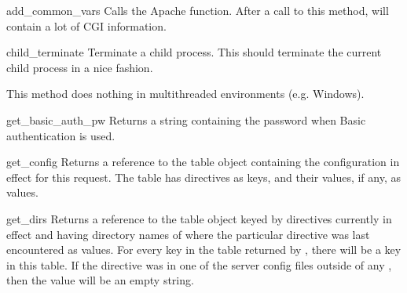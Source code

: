 \begin{methoddesc}[Request]{add_common_vars}{}
Calls the Apache  function. After a
call to this method,  will contain a
lot of CGI information.
\end{methoddesc}

\begin{methoddesc}[Request]{child_terminate}{}
Terminate a child process. This should terminate the current child
process in a nice fashion.
                  
This method does nothing in multithreaded environments (e.g. Windows). 
\end{methoddesc}

\begin{methoddesc}[Request]{get_basic_auth_pw}{}
Returns a string containing the password when Basic authentication is
used.
\end{methoddesc}

\begin{methoddesc}[Request]{get_config}{}
Returns a reference to the table object containing the configuration
in effect for this request. The table has directives as keys, and
their values, if any, as values.
\end{methoddesc}

\begin{methoddesc}[Request]{get_dirs}{}
Returns a reference to the table object keyed by directives currently
in effect and having directory names of where the particular directive
was last encountered as values. For every key in the table returned by
, there will be a key in this table. If the directive was
in one of the server config files outside of any ,
then the value will be an empty string.
\end{methoddesc}


